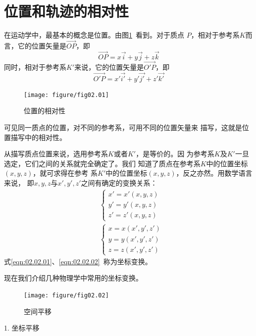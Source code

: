 \documentclass[../outline-of-mechanics.tex]{subfiles}
\begin{document}
\section{位置和轨迹的相对性}\label{sec:02.02}

在运动学中，最基本的概念是位置。由图\ref{fig:02.01}~看到。对于质点
$P$，相对于参考系$K$而言，它的位置矢量是$\vec{OP}$，即
\begin{equation*}
  \vec{OP}=x\vec{i}+y\vec{j}+z\vec{k}
\end{equation*}
同时，相对于参考系$K'$来说，它的位置矢量是$\vec{O'P}$，即
\begin{equation*}
  \vec{O'P}=x'\vec{i'}+y'\vec{j'}+z'\vec{k'}
\end{equation*}
\begin{figure}[h]
  \vspace{-1em}
  \centering
  \texttt{[image: figure/fig02.01]}
  \caption{位置的相对性}
  \label{fig:02.01}
\end{figure}

\clearpage
可见同一质点的位置，对不同的参考系，可用不同的位置矢量来
描写，这就是位置描写中的相对性。

从描写质点位置来说，选用参考系$ K $或者$ K' $，是等价的。因
为参考系$K$及$K'$一旦选定，它们之间的关系就完全确定了。我们
知道了质点在参考系$K$中的位置坐标$\left(x,y,z\right)$，就可求得在参考
系$K'$中的位置坐标$\left(x,y,z\right)$，反之亦然。用数学语言来说，
即$x,y,z$与$x',y',z'$之间有确定的变换关系：
\begin{align}
  \label{eqn:02.02.01}
   & \left\{\begin{array}{l}
              x'=x'\left(x, y, z\right) \\
              y'=y'\left(x, y, z\right) \\
              z'=z'\left(x, y, z\right)
            \end{array}\right.  \\
  \label{eqn:02.02.02}
   & \left\{\begin{array}{l}
              x=x\left(x', y', z'\right) \\
              y=y\left(x', y', z'\right) \\
              z=z\left(x', y', z'\right)
            \end{array}\right.
\end{align}
式\eqref{eqn:02.02.01}、\eqref{eqn:02.02.02}~称为坐标变换。

现在我们介绍几种物理学中常用的坐标变换。

\begin{figure}
  \centering
  \texttt{[image: figure/fig02.02]}
  \caption{空间平移}
  \label{fig:02.02}
\end{figure}
\textsf{1. 坐标平移}
\end{document}
